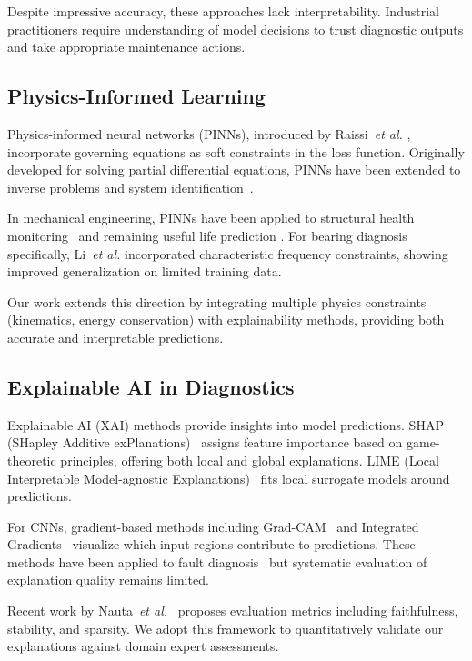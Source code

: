 \documentclass[journal]{IEEEtran}
\begin{document}
Despite impressive accuracy, these approaches lack interpretability.
Industrial practitioners require understanding of model decisions to
trust diagnostic outputs and take appropriate maintenance actions.

\subsection{Physics-Informed Learning}

Physics-informed neural networks (PINNs), introduced by Raissi~\textit{et al.}
\cite{raissi2019physics}, incorporate governing equations as soft constraints
in the loss function. Originally developed for solving partial differential
equations, PINNs have been extended to inverse problems and system
identification~\cite{karniadakis2021physics}.

In mechanical engineering, PINNs have been applied to structural health
monitoring~\cite{xu2021physics} and remaining useful life prediction
\cite{yucesan2021physics}. For bearing diagnosis specifically, Li~\textit{et al.}
\cite{li2022physics} incorporated characteristic frequency constraints,
showing improved generalization on limited training data.

Our work extends this direction by integrating multiple physics constraints
(kinematics, energy conservation) with explainability methods, providing
both accurate and interpretable predictions.

\subsection{Explainable AI in Diagnostics}

Explainable AI (XAI) methods provide insights into model predictions.
SHAP (SHapley Additive exPlanations)~\cite{lundberg2017shap} assigns
feature importance based on game-theoretic principles, offering both
local and global explanations. LIME (Local Interpretable Model-agnostic
Explanations)~\cite{ribeiro2016lime} fits local surrogate models around
predictions.

For CNNs, gradient-based methods including Grad-CAM~\cite{selvaraju2017gradcam}
and Integrated Gradients~\cite{sundararajan2017axiomatic} visualize which
input regions contribute to predictions. These methods have been applied
to fault diagnosis~\cite{grezmak2020interpretable} but systematic
evaluation of explanation quality remains limited.

Recent work by Nauta~\textit{et al.}~\cite{nauta2023methodological} proposes
evaluation metrics including faithfulness, stability, and sparsity. We
adopt this framework to quantitatively validate our explanations against
domain expert assessments.
\end{document}
